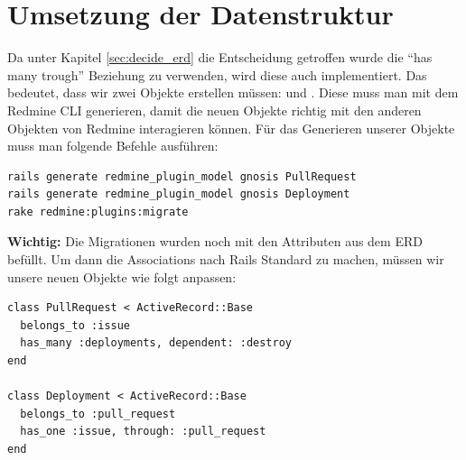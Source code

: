 \begin{minipage}{\textwidth}
  \section{Umsetzung der Datenstruktur}
  Da unter Kapitel \ref{sec:decide_erd} die Entscheidung getroffen wurde die \enquote{has many trough} Beziehung zu
  verwenden, wird diese auch implementiert. Das bedeutet, dass wir zwei Objekte erstellen müssen: 
   und . Diese muss man mit dem Redmine CLI generieren,
  damit die neuen Objekte richtig mit den anderen Objekten von Redmine interagieren können. Für das Generieren unserer
  Objekte muss man folgende Befehle ausführen:
  \begin{codebox}[]
    \begin{verbatim}
rails generate redmine_plugin_model gnosis PullRequest 
rails generate redmine_plugin_model gnosis Deployment
rake redmine:plugins:migrate
    \end{verbatim}
  \end{codebox}
  \textbf{Wichtig:} Die Migrationen wurden noch mit den Attributen aus dem ERD befüllt. \newline
  Um dann die Associations nach Rails Standard zu machen, müssen wir unsere neuen Objekte wie folgt anpassen:
  \begin{codebox}[]
    \begin{verbatim}
class PullRequest < ActiveRecord::Base
  belongs_to :issue
  has_many :deployments, dependent: :destroy
end

class Deployment < ActiveRecord::Base
  belongs_to :pull_request
  has_one :issue, through: :pull_request
end
    \end{verbatim}
  \end{codebox}
\end{minipage}

